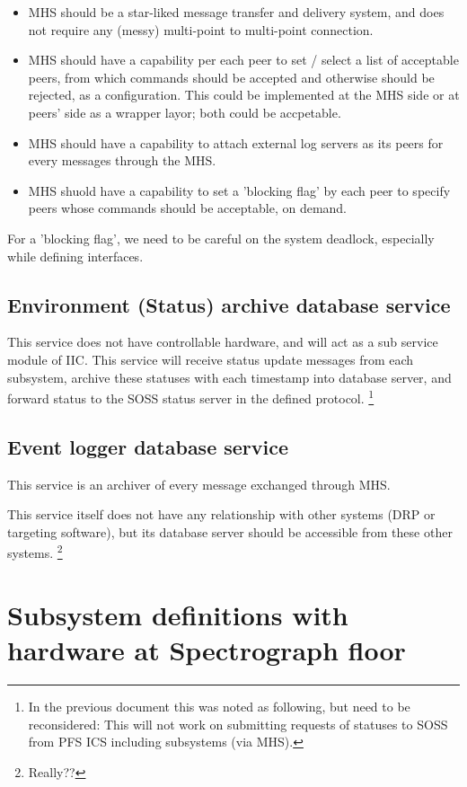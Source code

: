 \documentclass[a4paper,notitlepage]{article}
\begin{document}
\begin{itemize}
  \item MHS should be a star-liked message transfer and delivery system, 
    and does not require any (messy) multi-point to multi-point connection.
  \item MHS should have a capability per each peer to set / select 
    a list of acceptable peers, from which commands should be accepted and 
    otherwise should be rejected, as a configuration. 
    This could be implemented at the MHS side or at peers' side as a wrapper 
    layor; both could be accpetable.
  \item MHS should have a capability to attach external log servers as its 
    peers for every messages through the MHS. 
  \item MHS shuold have a capability to set a 'blocking flag' by each peer 
    to specify peers whose commands should be acceptable, on demand.
\end{itemize}

For a 'blocking flag', we need to be careful on the system deadlock, 
especially while defining interfaces. 


\subsection{Environment (Status) archive database service}

This service does not have controllable hardware, and will act as a sub 
service module of IIC. 
This service will receive status update messages from each subsystem, 
archive these statuses with each timestamp into database server, 
and forward status to the SOSS status server in the defined protocol. 
%
\footnote{In the previous document this was noted as following, but need to 
be reconsidered: 
This will not work on submitting requests of statuses to SOSS from PFS ICS 
including subsystems (via MHS).}

\subsection{Event logger database service}

This service is an archiver of every message exchanged through MHS. 

This service itself does not have any relationship with other systems 
(DRP or targeting software), 
but its database server should be accessible from these other systems.
\footnote{Really??}


\section{Subsystem definitions with hardware at Spectrograph floor}
\end{document}
